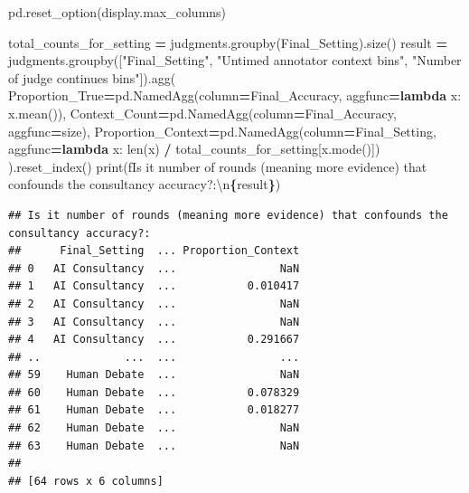 \documentclass[
]{article}
\newenvironment{Shaded}{\begin{snugshade}}{\end{snugshade}}
\newcommand{\BuiltInTok}[1]{#1}
\newcommand{\CharTok}[1]{\textcolor[rgb]{0.31,0.60,0.02}{#1}}
\newcommand{\KeywordTok}[1]{\textcolor[rgb]{0.13,0.29,0.53}{\textbf{#1}}}
\newcommand{\NormalTok}[1]{#1}
\newcommand{\OperatorTok}[1]{\textcolor[rgb]{0.81,0.36,0.00}{\textbf{#1}}}
\newcommand{\SpecialCharTok}[1]{\textcolor[rgb]{0.81,0.36,0.00}{\textbf{#1}}}
\newcommand{\SpecialStringTok}[1]{\textcolor[rgb]{0.31,0.60,0.02}{#1}}
\newcommand{\StringTok}[1]{\textcolor[rgb]{0.31,0.60,0.02}{#1}}
\begin{document}
\begin{Shaded}
\begin{Highlighting}[]
\NormalTok{pd.reset\_option(}\StringTok{\textquotesingle{}display.max\_columns\textquotesingle{}}\NormalTok{)}

\NormalTok{total\_counts\_for\_setting }\OperatorTok{=}\NormalTok{ judgments.groupby(}\StringTok{\textquotesingle{}Final\_Setting\textquotesingle{}}\NormalTok{).size()}
\NormalTok{result }\OperatorTok{=}\NormalTok{ judgments.groupby([}\StringTok{"Final\_Setting"}\NormalTok{, }\StringTok{"Untimed annotator context bins"}\NormalTok{, }\StringTok{"Number of judge continues bins"}\NormalTok{]).agg(}
\NormalTok{    Proportion\_True}\OperatorTok{=}\NormalTok{pd.NamedAgg(column}\OperatorTok{=}\StringTok{\textquotesingle{}Final\_Accuracy\textquotesingle{}}\NormalTok{, aggfunc}\OperatorTok{=}\KeywordTok{lambda}\NormalTok{ x: x.mean()),}
\NormalTok{    Context\_Count}\OperatorTok{=}\NormalTok{pd.NamedAgg(column}\OperatorTok{=}\StringTok{\textquotesingle{}Final\_Accuracy\textquotesingle{}}\NormalTok{, aggfunc}\OperatorTok{=}\StringTok{\textquotesingle{}size\textquotesingle{}}\NormalTok{),}
\NormalTok{    Proportion\_Context}\OperatorTok{=}\NormalTok{pd.NamedAgg(column}\OperatorTok{=}\StringTok{\textquotesingle{}Final\_Setting\textquotesingle{}}\NormalTok{, aggfunc}\OperatorTok{=}\KeywordTok{lambda}\NormalTok{ x: }\BuiltInTok{len}\NormalTok{(x) }\OperatorTok{/}\NormalTok{ total\_counts\_for\_setting[x.mode()])}
\NormalTok{).reset\_index()}
\BuiltInTok{print}\NormalTok{(}\SpecialStringTok{f\textquotesingle{}Is it number of rounds (meaning more evidence) that confounds the consultancy accuracy?:}\CharTok{\textbackslash{}n}\SpecialCharTok{\{}\NormalTok{result}\SpecialCharTok{\}}\SpecialStringTok{\textquotesingle{}}\NormalTok{)}
\end{Highlighting}
\end{Shaded}

\begin{verbatim}
## Is it number of rounds (meaning more evidence) that confounds the consultancy accuracy?:
##      Final_Setting  ... Proportion_Context
## 0   AI Consultancy  ...                NaN
## 1   AI Consultancy  ...           0.010417
## 2   AI Consultancy  ...                NaN
## 3   AI Consultancy  ...                NaN
## 4   AI Consultancy  ...           0.291667
## ..             ...  ...                ...
## 59    Human Debate  ...                NaN
## 60    Human Debate  ...           0.078329
## 61    Human Debate  ...           0.018277
## 62    Human Debate  ...                NaN
## 63    Human Debate  ...                NaN
## 
## [64 rows x 6 columns]
\end{verbatim}
\end{document}
